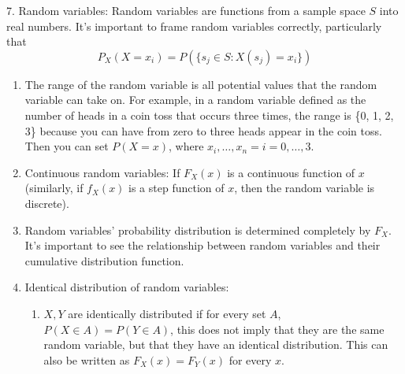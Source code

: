 \documentclass{article}
\begin{document}
7. Random variables: Random variables are functions from a sample space \(S\) into real numbers. It's important to frame random variables correctly, particularly that 
\[
P_X(X = x_i) = P(\{s_j \in S: X(s_j) = x_i\})
\]
   \begin{enumerate}
       \item The range of the random variable is all potential values that the random variable can take on. For example, in a random variable defined as the number of heads in a coin toss that occurs three times, the range is \{0, 1, 2, 3\} because you can have from zero to three heads appear in the coin toss. Then you can set \(P(X=x)\), where \(x_i, \ldots, x_n = i = 0, \ldots, 3\).
       \item Continuous random variables: If \(F_X(x)\) is a continuous function of \(x\) (similarly, if \(f_X(x)\) is a step function of \(x\), then the random variable is discrete).
       \item Random variables' probability distribution is determined completely by \(F_X\). It's important to see the relationship between random variables and their cumulative distribution function.
       \item Identical distribution of random variables: 
           \begin{enumerate}
               \item \(X, Y\) are identically distributed if for every set \(A\), \(P(X \in A) = P(Y \in A)\), this does not imply that they are the same random variable, but that they have an identical distribution. This can also be written as \(F_X(x) = F_Y(x)\) for every \(x\).
           \end{enumerate}
   \end{enumerate}
\end{document}

